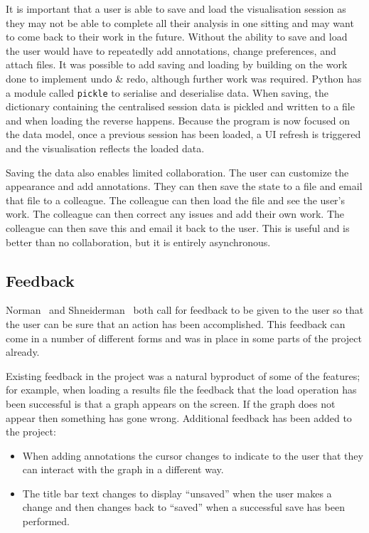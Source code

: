 It is important that a user is able to save and load the visualisation session as they may not be able to complete all their analysis in one sitting and may want to come back to their work in the future.  Without the ability to save and load the user would have to repeatedly add annotations, change preferences, and attach files.  It was possible to add saving and loading by building on the work done to implement undo \& redo, although further work was required. Python has a module called \texttt{pickle} to serialise and deserialise data.  When saving, the dictionary containing the centralised session data is pickled and written to a file and when loading the reverse happens.  Because the program is now focused on the data model, once a previous session has been loaded, a \ac{UI} refresh is triggered and the visualisation reflects the loaded data.

Saving the data also enables limited collaboration.  The user can customize the appearance and add annotations.  They can then save the state to a file and email that file to a colleague.  The colleague can then load the file and see the user's work.  The colleague can then correct any issues and add their own work.  The colleague can then save this and email it back to the user.  This is useful and is better than no collaboration, but it is entirely asynchronous.

\subsection{Feedback}
Norman~\cite{normsev} and Shneiderman~\cite{shgold} both call for feedback to be given to the user so that the user can be sure that an action has been accomplished.  This feedback can come in a number of different forms and was in place in some parts of the project already.

Existing feedback in the project was a natural byproduct of some of the features; for example, when loading a results file the feedback that the load operation has been successful is that a graph appears on the screen. If the graph does not appear then something has gone wrong.  Additional feedback has been added to the project:
\begin{itemize}
\item When adding annotations the cursor changes to indicate to the user that they can interact with the graph in a different way.
\item The title bar text changes to display ``unsaved'' when the user makes a change and then changes back to ``saved'' when a successful save has been performed.
\end{itemize}

